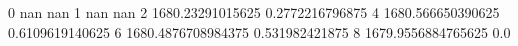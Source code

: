 0 nan nan
1 nan nan
2 1680.23291015625 0.2772216796875
4 1680.566650390625 0.6109619140625
6 1680.4876708984375 0.531982421875
8 1679.9556884765625 0.0
